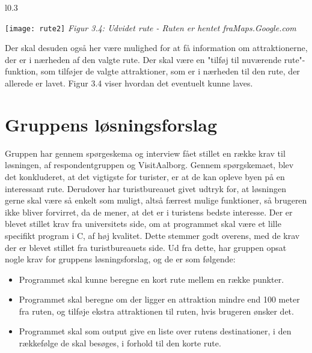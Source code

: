 \begin{wrapfigure}{l}{0.3\textwidth}
	\vspace{-20pt}
	\begin{center}
		\texttt{[image: rute2]} \newline
		\textit{Figur 3.4: Udvidet rute - Ruten er hentet fra\newline Maps.Google.com}\newline
	\end{center}
	\vspace{-20pt}
	\vspace{-10pt}
\end{wrapfigure}

Der skal desuden også her være mulighed for at få information om attraktionerne, der er i nærheden af den valgte rute. Der skal være en "tilføj til nuværende rute"-funktion, som tilføjer de valgte attraktioner, som er i nærheden til den rute, der allerede er lavet. Figur 3.4 viser hvordan det eventuelt kunne laves. \newline
\newline
\newline
\newline
\newline
\newline
\newline
\newline
\newline
\newline
\newline
\newline


\section{Gruppens løsningsforslag}
Gruppen har gennem spørgeskema og interview fået stillet en række krav til løsningen, af respondentgruppen og VisitAalborg. 
Gennem spørgskemaet, blev det konkluderet, at det vigtigste for turister, er at de kan opleve byen på en interessant rute. 
Derudover har turistbureauet givet udtryk for, at løsningen gerne skal være så enkelt som muligt, altså færrest mulige funktioner, så brugeren ikke bliver forvirret, da de mener, at det er i turistens bedste interesse. \newline
Der er blevet stillet krav fra universitets side, om at programmet skal være et lille specifikt program i C, af høj kvalitet. Dette stemmer godt overens, med de krav der er blevet stillet fra turistbureauets side.   \newline
Ud fra dette, har gruppen opsat nogle krav for gruppens løsningsforslag, og de er som følgende:
\begin{itemize}
	\item Programmet skal kunne beregne en kort rute mellem en række punkter.
	\item Programmet skal beregne om der ligger en attraktion mindre end 100 meter fra ruten, og tilføje ekstra attraktionen til ruten, hvis brugeren ønsker det.
	\item Programmet skal som output give en liste over rutens destinationer, i den rækkefølge de skal besøges, i forhold til den korte rute.
\end{itemize}

